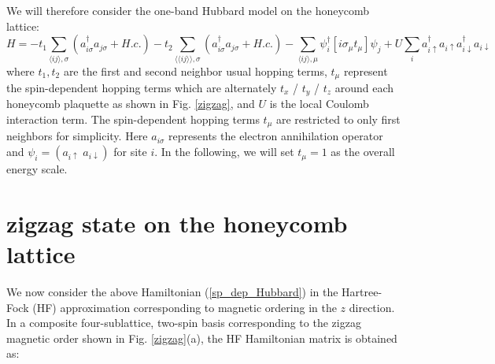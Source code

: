 \documentclass[aps,prb,fleqn,12pt,amsmath,amssymb]{revtex4}
\begin{document}
We will therefore consider the one-band Hubbard model on the honeycomb lattice:
\begin{equation}
H = -t_1 \sum_{\langle ij \rangle,\sigma} (a_{i\sigma} ^\dagger a_{j\sigma} + H.c.)
-t_2 \sum_{\langle \langle ij \rangle \rangle,\sigma} (a_{i\sigma} ^\dagger a_{j\sigma} + H.c.)
- \sum_{\langle ij \rangle,\mu} \psi_i ^\dagger [i \sigma_\mu t_\mu] \psi_j  
+ U \sum_i a_{i\uparrow} ^\dagger a_{i\uparrow} a_{i\downarrow} ^\dagger a_{i\downarrow}
\label{sp_dep_Hubbard}
\end{equation}
where $t_1,t_2$ are the first and second neighbor usual hopping terms, $t_\mu$ represent the spin-dependent hopping terms which are alternately $t_x$ / $t_y$ / $t_z$ around each honeycomb plaquette as shown in Fig. \ref{zigzag}, and $U$ is the local Coulomb interaction term. The spin-dependent hopping terms $t_\mu$ are restricted to only first neighbors for simplicity. Here $a_{i\sigma}$ represents the electron annihilation operator and $\psi_i = (a_{i\uparrow} \; a_{i\downarrow})$ for site $i$. In the following, we will set $t_\mu = 1$ as the overall energy scale. 

\section{zigzag state on the honeycomb lattice}

We now consider the above Hamiltonian (\ref{sp_dep_Hubbard}) in the Hartree-Fock (HF) approximation corresponding to magnetic ordering in the $z$ direction. In a composite four-sublattice, two-spin basis corresponding to the zigzag magnetic order shown in Fig. \ref{zigzag}(a), the HF Hamiltonian matrix is obtained as:
\end{document}

